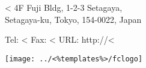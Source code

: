 \parbox[t]{.60\textwidth}{
\vspace{0.3cm}
        {<%
          4F Fuji Bldg, 1-2-3 Setagaya, \\
         Setagaya-ku, Tokyo, 154-0022, Japan \\
        }
}
\parbox[t]{.30\textwidth}{
\vspace{0.3cm}
        {Tel: <%
        Fax: <%
        URL: http://<%
        }
}
\parbox[t]{.10\textwidth}{
\vspace{0.2cm}
   \texttt{[image: ../<\%templates\%>/fclogo]}
}
